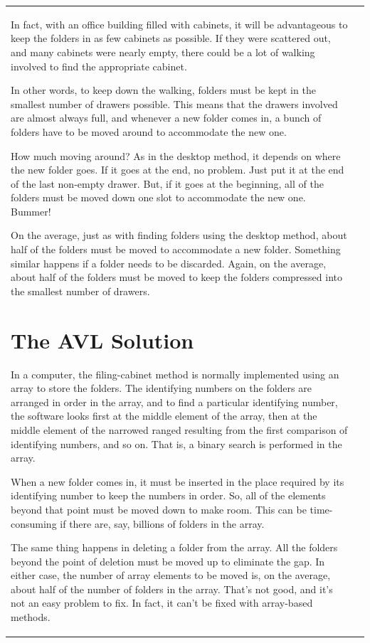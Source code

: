 \begin{tabular}{ll}
In fact, with an office building filled with cabinets, it will be
advantageous to keep the folders in as few cabinets as possible. If
they were scattered out, and many cabinets were nearly empty, there
could be a lot of walking involved to find the appropriate cabinet.

In other words, to keep down the walking, folders must be kept in
the smallest number of drawers possible. This means that the drawers
involved are almost always full, and whenever a new folder comes in,
a bunch of folders have to be moved around to accommodate the new
one.

How much moving around? As in the desktop method, it depends on
where the new folder goes. If it goes at the end, no problem. Just
put it at the end of the last non-empty drawer. But, if it goes at
the beginning, all of the folders must be moved down one slot to
accommodate the new one. Bummer!

On the average, just as with finding folders using the desktop
method, about half of the folders must be moved to accommodate a new
folder. Something similar happens if a folder needs to be discarded.
Again, on the average, about half of the folders must be moved to
keep the folders compressed into the smallest number of drawers.

\section{The AVL Solution}

In a computer, the filing-cabinet method is normally implemented
using an array to store the folders. The identifying numbers on the
folders are arranged in order in the array, and to find a particular
identifying number, the software looks first at the middle element
of the array, then at the middle element of the narrowed ranged
resulting from the first comparison of identifying numbers, and so
on. That is, a binary search is performed in the array.

When a new folder comes in, it must be inserted in the
place required by its identifying number to keep the numbers
in order. So, all of the elements beyond that point
must be moved down to make room. This can be time-consuming if there
are, say, billions of folders in the array.

The same thing happens in deleting a folder from the array. All the
folders beyond the point of deletion must be moved up to eliminate
the gap. In either case, the number of array elements to be moved
is, on the average, about half of the number of folders in the array.
That's not good, and it's not an easy problem to fix.
In fact, it can't be fixed with array-based methods.


\end{tabular}
